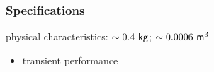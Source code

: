 \subsubsection{Specifications}
physical characteristics: $\sim 0.4 \ \mathsf{kg}$; $\sim 0.0006 \ \mathsf{m}^3$
\begin{itemize}
    \item transient performance
\end{itemize}

